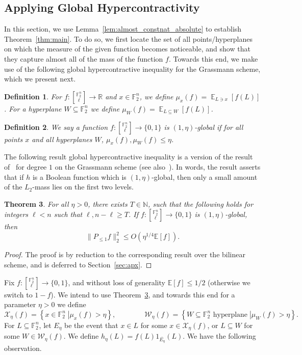 \documentclass[11pt]{article}
\newtheorem{thm}{Theorem}[section]
\newtheorem{definition}[thm]{Definition}
\newcommand\E{\mathbb{E}}
\newcommand\sett[2]{\left\{ \left. #1 \;\right\vert #2 \right\}}
\newcommand\norm[1]{\| #1 \|}
\newcommand\Expect[2]{{\mathop{\mathbb{E}}_{#1}\left[ {#2} \right]}}
\renewcommand\geq{\geqslant}
\renewcommand\leq{\leqslant}
\providecommand{\sqbinom}[2]{\genfrac{[}{]}{0pt}{}{#1}{#2}}
\begin{document}
\subsection{Applying Global Hypercontractivity}
In this section, we use Lemma~\ref{lem:almost_constnat_absolute} to establish Theorem~\ref{thm:main}. To do so, we first locate the set of all points/hyperplanes on which the measure of the given function becomes noticeable, and show that they capture almost all of the mass of the function $f$. Towards this end, we make use of the following global hypercontractive inequality for the Grassmann scheme, which we present next.
\begin{definition}
    For $f\colon {\sqbinom{\mathbb{F}_2^n}{\ell}}\to\mathbb{R}$ and $x\in \mathbb{F}_2^n$, we define 
    $\mu_x(f) = \Expect{L\ni x}{f(L)}$. For a hyperplane $W\subseteq \mathbb{F}_2^n$ we define $\mu_W(f)=\Expect{L\subseteq W}{f(L)}$.
\end{definition}
\begin{definition}
    We say a function $f\colon {\sqbinom{\mathbb{F}_2^n}{\ell}}\to\{0,1\}$ is $(1,\eta)$-global if for all points $x$ and all hyperplanes $W$, 
    $\mu_x(f),\mu_W(f)\leq \eta$.
\end{definition}

The following result global hypercontractive inequality is a version of the result of~\cite{KMS2} for degree $1$ on the Grassmann scheme (see also~\cite{DKKMS2,Ellis2023analogue}). In words, the result asserts that if $h$ is a Boolean function which is $(1,\eta)$-global, then only a small amount of the $L_2$-mass lies on the first two levels.
\begin{thm}\label{thm:lvl_1_ineq}
    For all $\eta>0$, there exists $T\in\mathbb{N}$, such that the following holds for integers $\ell<n$ such that 
    $\ell, n-\ell\geq T$. If $f\colon {\sqbinom{\mathbb{F}_2^n}{\ell}}\to\{0,1\}$ is $(1,\eta)$-global, then
    \[
    \norm{P_{\leq 1} f}_2^2\leq O(\eta^{1/4} \E[f]).
    \]
\end{thm}
\begin{proof}
    The proof is by reduction to the corresponding result over the bilinear scheme, and is deferred to Section~\ref{sec:apx}.
\end{proof}

Fix $f\colon {\sqbinom{\mathbb{F}_2^n}{\ell}}\to\{0,1\}$, and without loss of generality $\E[f]\leq 1/2$ (otherwise we switch to $1-f$). We intend to use Theorem~\ref{thm:lvl_1_ineq}, and towards this end for a parameter $\eta>0$ we define
\[
\mathcal{X}_{\eta}(f) = \sett{x\in\mathbb{F}_2^n}{\mu_x(f)> \eta},
\qquad\qquad
\mathcal{W}_{\eta}(f)
=
\sett{W\subseteq\mathbb{F}_2^n\text{ hyperplane}}{\mu_W(f)> \eta}.
\]
For $L\subseteq \mathbb{F}_2^n$, let $E_{\eta}$ be the event that $x\in L$ for some $x\in \mathcal{X}_{\eta}(f)$, 
or $L\subseteq W$ for some $W\in \mathcal{W}_{\eta}(f)$. We define $h_{\eta}(L) = f(L) 1_{\overline{E_{\eta}}}(L)$. We have the following observation.
\end{document}
